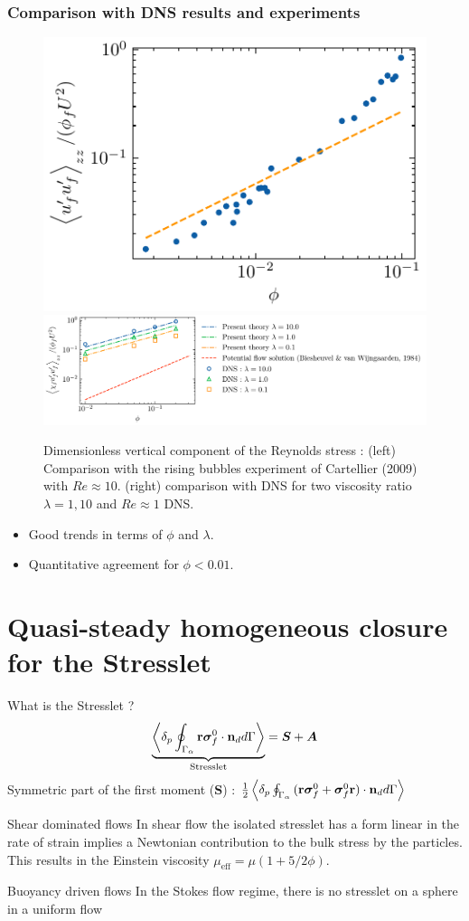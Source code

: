 \documentclass{sintefbeamer}
\begin{document}
\begin{frame}
  \frametitle{Comparison with DNS results and experiments}
  \begin{figure}[h!]
    \centering    
    \includegraphics[height = 0.2\textwidth]{image/HOMOGENEOUS_final/CA/cartellier.pdf}
    \includegraphics[height = 0.2\textwidth]{image/HOMOGENEOUS_final/CA/UUyy_Ga_5.pdf}
    \caption{
       Dimensionless vertical component of the Reynolds stress :
       (left) Comparison with the rising bubbles experiment of Cartellier (2009) with $Re \approx 10$. 
       (right) comparison with DNS for two viscosity ratio $\lambda =1,10$ and $Re \approx 1$ DNS. 
    }
    \label{fig:Cp}
\end{figure}  
\begin{itemize}
  \item Good trends in terms of $\phi$ and $\lambda$.  
  \item Quantitative agreement for $\phi < 0.01$.  
\end{itemize}
\end{frame}

\section{Quasi-steady homogeneous closure for the Stresslet}
\begin{frame}{What is the Stresslet ?}
\begin{equation}
  \underbrace{ {\left<\delta_p \oint_{\Gamma_{\alpha}} {\textbf{r}\bm{\sigma}_f^0 \cdot \textbf{n}_d} d\Gamma\right>}}_\text{Stresslet} = \bm S + \bm A
\end{equation}
Symmetric part of the first moment ($\bm S$) : $\frac{1}{2} \left<\delta_p \oint_{\Gamma_{\alpha}} {(\textbf{r}\bm{\sigma}_f^0 + \bm{\sigma}_f^0\textbf{r})\cdot \textbf{n}_d} d\Gamma\right>$

\begin{block}{Shear dominated flows}
In shear flow the isolated stresslet has a form linear in the rate of strain implies a Newtonian contribution to the bulk stress by the particles. 
This results in the Einstein viscosity $\mu_{\text{eff}} = \mu (1+5/2\phi)$.
\end{block}

\begin{block}{Buoyancy driven flows}
  In the Stokes flow regime, there is no stresslet on a sphere in a uniform flow
\end{block}


\end{frame}
\end{document}

